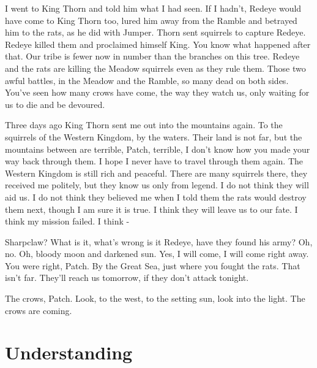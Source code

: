 \documentclass[12pt]{book}
\begin{document}
 I went to King Thorn and told him what I had seen. If I hadn't, Redeye would have come to King Thorn too, lured him away from the Ramble and betrayed him to the rats, as he did with Jumper. Thorn sent squirrels to capture Redeye. Redeye killed them and proclaimed himself King. You know what happened after that. Our tribe is fewer now in number than the branches on this tree. Redeye and the rats are killing the Meadow squirrels even as they rule them. Those two awful battles, in the Meadow and the Ramble, so many dead on both sides. You've seen how many crows have come, the way they watch us, only waiting for us to die and be devoured.\par
 Three days ago King Thorn sent me out into the mountains again. To the squirrels of the Western Kingdom, by the waters. Their land is not far, but the mountains between are terrible, Patch, terrible, I don't know how you made your way back through them. I hope I never have to travel through them again. The Western Kingdom is still rich and peaceful. There are many squirrels there, they received me politely, but they know us only from legend. I do not think they will aid us. I do not think they believed me when I told them the rats would destroy them next, though I am sure it is true. I think they will leave us to our fate. I think my mission failed. I think -\par
 Sharpclaw? What is it, what's wrong %
 is it Redeye, have they found his army? Oh, no. Oh, bloody moon and darkened sun. Yes, I will come, I will come right away. You were right, Patch. By the Great Sea, just where you fought the rats. That isn't far. They'll reach us tomorrow, if they don't attack tonight.\par
 The crows, Patch. Look, to the west, to the setting sun, look into the light. The crows are coming.\par

\section{Understanding}
\end{document}
